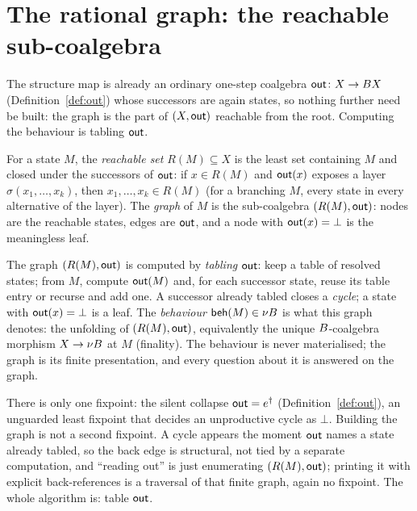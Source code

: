 \section{The rational graph: the reachable sub-coalgebra}\label{sec:readout}
The structure map is already an ordinary one-step coalgebra $\mathsf{out} \colon X \to B X$
(Definition~\ref{def:out}) whose successors are again states, so nothing further need be built: the
graph is the part of $(X,\mathsf{out})$ reachable from the root. Computing the behaviour is tabling $\mathsf{out}$.

\begin{definition}\label{def:reach}
  For a state $M$, the \emph{reachable set} $R(M) \subseteq X$ is the least set containing $M$ and
  closed under the successors of $\mathsf{out}$: if $x \in R(M)$ and $\mathsf{out}(x)$ exposes a layer
  $\sigma(x_1,\dots,x_k)$, then $x_1,\dots,x_k \in R(M)$ (for a branching $M$, every state in every
  alternative of the layer). The \emph{graph} of $M$ is the sub-coalgebra $(R(M),\mathsf{out})$: nodes are the
  reachable states, edges are $\mathsf{out}$, and a node with $\mathsf{out}(x)=\bot$ is the meaningless leaf.
\end{definition}

\begin{definition}\label{def:behreadout}
  The graph $(R(M),\mathsf{out})$ is computed by \emph{tabling} $\mathsf{out}$: keep a table of resolved states; from
  $M$, compute $\mathsf{out}(M)$ and, for each successor state, reuse its table entry or recurse and add one. A
  successor already tabled closes a \emph{cycle}; a state with $\mathsf{out}(x)=\bot$ is a leaf. The
  \emph{behaviour} $\mathsf{beh}(M) \in \nu B$ is what this graph denotes: the unfolding of $(R(M),\mathsf{out})$,
  equivalently the unique $B$-coalgebra morphism $X \to \nu B$ at $M$ (finality). The behaviour is
  never materialised; the graph is its finite presentation, and every question about it is answered on
  the graph.
\end{definition}

\begin{remark}\label{rem:twofix}
  There is only one fixpoint: the silent collapse $\mathsf{out} = e^{\dagger}$ (Definition~\ref{def:out}), an
  unguarded least fixpoint that decides an unproductive cycle as $\bot$. Building the graph is not a
  second fixpoint. A cycle appears the moment $\mathsf{out}$ names a state already tabled, so the back edge is
  structural, not tied by a separate computation, and ``reading out'' is just enumerating
  $(R(M),\mathsf{out})$; printing it with explicit back-references is a traversal of that finite graph, again no
  fixpoint. The whole algorithm is: table $\mathsf{out}$.
\end{remark}

